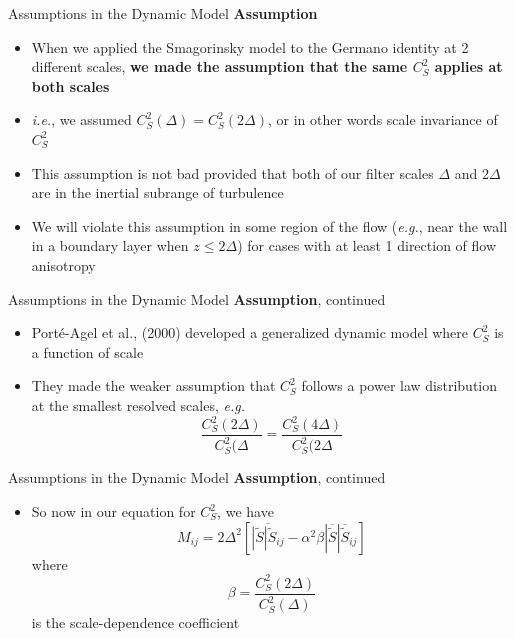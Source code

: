 \begin{frame}{Assumptions in the Dynamic Model}
\textbf{ Assumption}
\begin{itemize}
	\item When we applied the Smagorinsky model to the Germano identity at 2 different scales, \textbf{we made the assumption that the same $C_S^2$ applies at both scales}
	\item \textit{i.e.}, we assumed $C_S^2(\Delta) = C_S^2(2\Delta)$, or in other words scale invariance of $C_S^2$
	\item  This assumption is not bad provided that both of our filter scales $\Delta$ and $2\Delta$ are in the inertial subrange of turbulence
	\item We will violate this assumption in some region of the flow (\textit{e.g.}, near the wall in a boundary layer when $z \leq 2\Delta$) for cases with at least 1 direction of flow anisotropy
\end{itemize}
\end{frame}

\begin{frame}{Assumptions in the Dynamic Model}
\textbf{ Assumption}, continued
\begin{itemize}
	\item Port\'{e}-Agel et al., (2000) developed a generalized dynamic model where $C_S^2$ is a function of scale
	\item They made the weaker assumption that $C_S^2$ follows a power law distribution at the smallest resolved scales, \textit{e.g.}
	$$\frac{C_S^2(2\Delta)}{C_S^2(\Delta} = \frac{C_S^2(4\Delta)}{C_S^2(2\Delta}$$
\end{itemize}
\end{frame}

\begin{frame}{Assumptions in the Dynamic Model}
\textbf{ Assumption}, continued
\begin{itemize}
	\item So now in our equation for $C_S^2$, we have
	$$M_{ij} = 2\Delta^2\left[\overline{\left|\widetilde{S}\right|\widetilde{S}_{ij}} - \alpha^2\beta\left|\overline{\widetilde{S}}\right|\overline{\widetilde{S}}_{ij}\right]$$
	where
	$$\beta = \frac{C_S^2(2\Delta)}{C_S^2(\Delta)}$$
	is the scale-dependence coefficient	
\end{itemize}
\end{frame}






